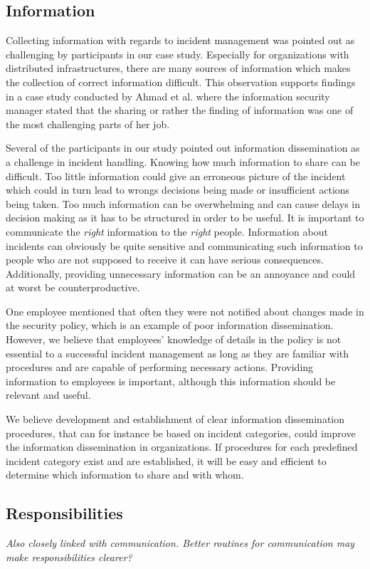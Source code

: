 \subsection{Information}
Collecting information with regards to incident management was pointed out as challenging by participants in our case study. Especially for organizations with distributed infrastructures, there are many sources of information which makes the collection of correct information difficult. This observation supports findings in a case study conducted by Ahmad et al.\cite{ahmad2012incident} where the information security manager stated that the sharing or rather the finding of information was one of the most challenging parts of her job. 

Several of the participants in our study pointed out information dissemination as a challenge in incident handling. Knowing how much information to share can be difficult. Too little information could give an erroneous picture of the incident which could in turn lead to wrongs decisions being made or insufficient actions being taken. Too much information can be overwhelming and can cause delays in decision making as it has to be structured in order to be useful. It is important to communicate the \textit{right} information to the \textit{right} people. Information about incidents can obviously be quite sensitive and communicating such information to people who are not supposed to receive it can have serious consequences. Additionally, providing unnecessary information can be an annoyance and could at worst be counterproductive.

One employee mentioned that often they were not notified about changes made in the security policy, which is an example of poor information dissemination. However, we believe that employees' knowledge of details in the policy is not essential to a successful incident management as long as they are familiar with procedures and are capable of performing necessary actions. Providing information to employees is important, although this information should be relevant and useful.

We believe development and establishment of clear information dissemination procedures, that can for instance be based on incident categories, could improve the information dissemination in organizations. If procedures for each predefined incident category exist and are established, it will be easy and efficient to determine which information to share and with whom.

\subsection{Responsibilities}
\textit{Also closely linked with communication. Better routines for communication may make responsibilities clearer?}

